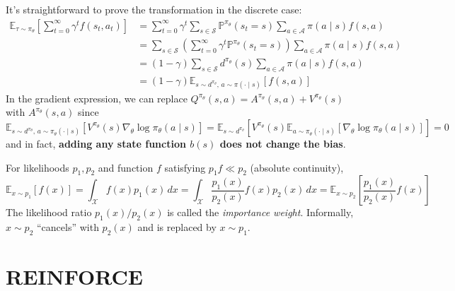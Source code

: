 \documentclass[11pt, letterpaper]{article}
\begin{document}
\begin{remark}
    It's straightforward to prove the transformation in the discrete case: 
    \begin{align*}
        \mathbb{E}_{\tau \sim \pi_\theta}\left[\sum_{t=0}^\infty \gamma^t f(s_t, a_t)\right]
        &= \sum_{t=0}^\infty \gamma^t \sum_{s \in \mathcal{S}} \mathbb{P}^{\pi_\theta}(s_t = s) \sum_{a \in \mathcal{A}} \pi(a \mid s) f(s, a) \\
        &= \sum_{s \in \mathcal{S}} \left( \sum_{t=0}^\infty \gamma^t \mathbb{P}^{\pi_\theta}(s_t = s) \right) \sum_{a \in \mathcal{A}} \pi(a \mid s) f(s, a) \\
        &= (1 - \gamma) \sum_{s \in \mathcal{S}} d^{\pi_\theta}(s) \sum_{a \in \mathcal{A}} \pi(a \mid s) f(s, a) \\
        &= (1 - \gamma) \mathbb{E}_{s \sim d^{\pi_\theta},\, a \sim \pi(\cdot \mid s)}[f(s, a)]
    \end{align*}
    In the gradient expression, we can replace \(Q^{\pi_\theta}(s,a) = A^{\pi_\theta}(s,a) + V^{\pi_\theta}(s)\) with \(A^{\pi_\theta}(s,a)\) since
    \[
        \mathbb{E}_{s \sim d^{\pi_\theta},\, a \sim \pi_\theta(\cdot \mid s)}[V^{\pi_\theta}(s) \nabla_\theta \log \pi_\theta(a \mid s)]
        = \mathbb{E}_{s \sim d^{\pi_\theta}}[V^{\pi_\theta}(s) \mathbb{E}_{a \sim \pi_\theta(\cdot \mid s)}[\nabla_\theta \log \pi_\theta(a \mid s)]] = 0
    \]
    and in fact, \textbf{adding any state function \(b(s)\) does not change the bias}. 
\end{remark}

\begin{concept}
    For likelihoods \(p_1, p_2\) and function \(f\) satisfying \(p_1 f \ll p_2\) (absolute continuity),
    \[
        \mathbb{E}_{x \sim p_1}[f(x)]
        = \int_{\mathcal{X}} f(x) p_1(x) \,dx
        = \int_{\mathcal{X}} \frac{p_1(x)}{p_2(x)} f(x) p_2(x) \,dx
        = \mathbb{E}_{x \sim p_2} \left[ \frac{p_1(x)}{p_2(x)} f(x) \right]
    \]
    The likelihood ratio \(p_1(x) / p_2(x)\) is called the \textit{importance weight}. Informally, \(x \sim p_2\) ``cancels'' with \(p_2(x)\) and is replaced by \(x \sim p_1\). 
\end{concept}

\section{REINFORCE}
\end{document}
